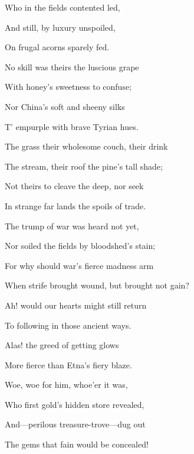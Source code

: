 Who in the fields contented led,

And still, by luxury unspoiled,

On frugal acorns sparely fed.

No skill was theirs the luscious grape

With honey's sweetness to confuse;

Nor China's soft and sheeny silks

T' empurple with brave Tyrian hues.

The grass their wholesome couch, their drink

The stream, their roof the pine's tall shade;

Not theirs to cleave the deep, nor seek

In strange far lands the spoils of trade.

The trump of war was heard not yet,

Nor soiled the fields by bloodshed's stain;

For why should war's fierce madness arm

When strife brought wound, but brought not gain?

Ah! would our hearts might still return

To following in those ancient ways.

Alas! the greed of getting glows

More fierce than Etna's fiery blaze.

Woe, woe for him, whoe'er it was,

Who first gold's hidden store revealed,

And—perilous treasure-trove—dug out

The gems that fain would be concealed!


